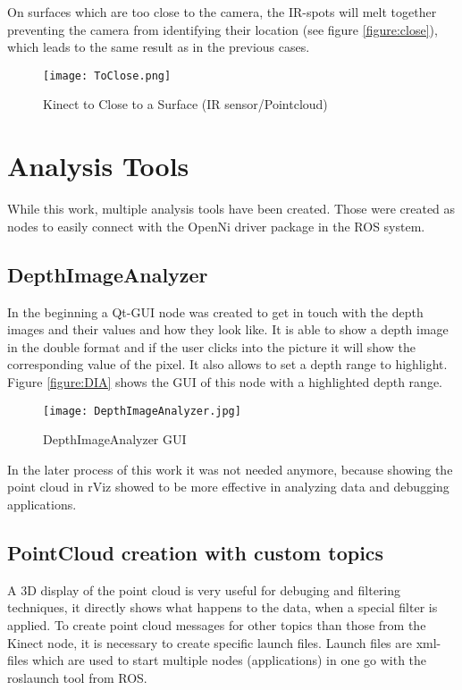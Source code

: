 On surfaces which are too close to the camera, the IR-spots will melt together preventing the camera from
identifying their location (see figure \vref{figure:close}), which leads to the same result as in the previous cases.
\begin{figure}[htp]
\begin{center}
  \texttt{[image: ToClose.png]} 
  \caption{Kinect to Close to a Surface (IR sensor/Pointcloud)}
  \label{figure:close}
\end{center}
\end{figure}
\clearpage 
 
\section{Analysis Tools} 
While this work, multiple analysis tools have been created. Those were created as
nodes to easily connect with the OpenNi driver package in the ROS system.
\subsection{DepthImageAnalyzer}\label{Sect:DepthImageAnalyzer}
In the beginning a Qt-GUI node was created to get in touch with the depth images and 
their values and how they look like. It is able to show a depth image in the double
format and if the user clicks into the picture it will show the corresponding 
value of the pixel. It also allows to set a depth range to highlight. 
Figure \vref{figure:DIA} shows the GUI of this node with a highlighted depth range.

\begin{figure}[h!tp]
\begin{center}
  \texttt{[image: DepthImageAnalyzer.jpg]}
  \caption{DepthImageAnalyzer GUI}
  \label{figure:DIA}
\end{center}
\end{figure}
\clearpage 


In the later process of this work it was not needed anymore, because showing the point cloud
in rViz showed to be more effective in analyzing data and debugging applications.

\subsection{PointCloud creation with custom topics}
A 3D display of the point cloud is very useful for debuging and filtering techniques, it directly shows what 
happens to the data, when a special filter is applied.
To create point cloud messages for other topics than those from the Kinect node, it is necessary to
create specific launch files. Launch files are xml-files which are used to start multiple nodes (applications) 
in one go with the roslaunch tool from ROS. 


